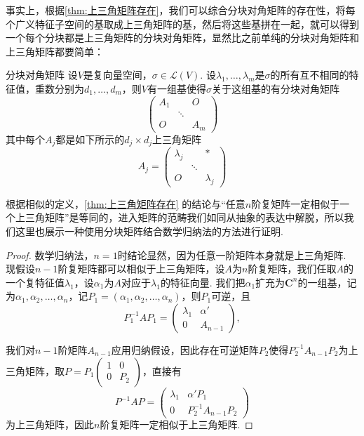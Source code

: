 事实上，根据\autoref{thm:上三角矩阵存在}，我们可以综合分块对角矩阵的存在性，将每个广义特征子空间的基取成上三角矩阵的基，然后将这些基拼在一起，就可以得到一个每个分块都是上三角矩阵的分块对角矩阵，显然比之前单纯的分块对角矩阵和上三角矩阵都要简单：
\begin{theorem}{}{分块对角矩阵}
    设$V$是复向量空间，$\sigma\in \mathcal{L}(V)$. 设$\lambda_1,\ldots,\lambda_m$是$\sigma$的所有互不相同的特征值，重数分别为$d_1,\ldots,d_m$，则$V$有一组基使得$\sigma$关于这组基的有分块对角矩阵
    \[\begin{pmatrix}
            A_1 &  & O \\  & \ddots &  \\ O &  & A_m
        \end{pmatrix}\]
    其中每个$A_j$都是如下所示的$d_j\times d_j$上三角矩阵
    \[A_j=\begin{pmatrix}
            \lambda_j &  & * \\  & \ddots &  \\ O &  & \lambda_j
        \end{pmatrix}\]
\end{theorem}

根据相似的定义，\autoref{thm:上三角矩阵存在} 的结论与``任意$n$阶复矩阵一定相似于一个上三角矩阵''是等同的，进入矩阵的范畴我们如同从抽象的表达中解脱，所以我们这里也展示一种使用分块矩阵结合数学归纳法的方法进行证明.
\begin{proof}
    数学归纳法，$n=1$时结论显然，因为任意一阶矩阵本身就是上三角矩阵. 现假设$n-1$阶复矩阵都可以相似于上三角矩阵，设$A$为$n$阶复矩阵，我们任取$A$的一个复特征值$\lambda_1$，设$\alpha_1$为$A$对应于$\lambda_1$的特征向量. 我们把$\alpha_1$扩充为$\mathbf{C}^n$的一组基，记为$\alpha_1,\alpha_2,\ldots,\alpha_n$，记$P_1=(\alpha_1,\alpha_2,\ldots,\alpha_n)$，则$P_1$可逆，且
    \[P_1^{-1}AP_1=\begin{pmatrix}
            \lambda_1 & \alpha' \\ 0 & A_{n-1}
        \end{pmatrix},\]

    我们对$n-1$阶矩阵$A_{n-1}$应用归纳假设，因此存在可逆矩阵$P_2$使得$P_2^{-1}A_{n-1}P_2$为上三角矩阵，取$P=P_1\begin{pmatrix}
            1 & 0 \\ 0 & P_2
        \end{pmatrix}$，直接有
    \[P^{-1}AP=\begin{pmatrix}
            \lambda_1 & \alpha'P_1 \\ 0 & P_2^{-1}A_{n-1}P_2
        \end{pmatrix}\]
    为上三角矩阵，因此$n$阶复矩阵一定相似于上三角矩阵.
\end{proof}

